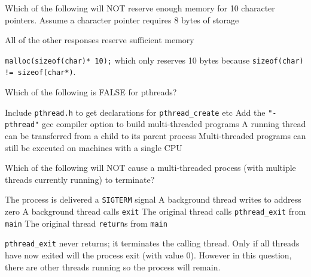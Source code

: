 \variant
Which of the following will NOT reserve enough memory for 10 character pointers. Assume a character pointer requires 8 bytes of storage
\begin{answers}
\answer All of the other responses reserve sufficient memory
\end{answers}
\begin{solution}
{\tt malloc(sizeof(char)* 10);} which only reserves 10 bytes because {\tt sizeof(char) != sizeof(char*)}.
\end{solution}



\variant
Which of the following is FALSE for pthreads?
\begin{answers}
\answer Include {\tt pthread.h} to get declarations for {\tt pthread_create} etc
\answer Add the {\tt "-pthread"} gcc compiler option to build multi-threaded programs
\correctanswer A running thread can be transferred from a child to its parent process
\answer Multi-threaded programs can still be executed on machines with a single CPU
\end{answers}
\begin{solution}
\end{solution}


\variant
Which of the following will NOT cause a multi-threaded process (with multiple threads currently running) to terminate?
\begin{answers}
\answer The process is delivered a {\tt SIGTERM} signal
\answer A background thread writes to address zero
\answer A background thread calls {\tt exit}
\correctanswer The original thread calls {\tt pthread_exit} from {\tt main}
\answer The original thread {\tt return}s from {\tt main}
\end{answers}
\begin{solution}
{\tt pthread_exit} never returns; it terminates the calling thread. Only if all threads have now exited will the process exit (with value 0). However in this question, there are other threads running so the process will remain.
\end{solution}



